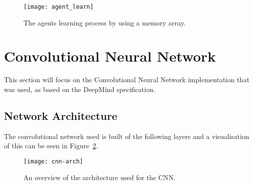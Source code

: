 \begin{figure}[h]
    \centering
    \texttt{[image: agent\_learn]}
    \caption{The agents learning process by using a memory array.}%
    \label{fig:agent_learn}
\end{figure}

\section{Convolutional Neural Network}

This section will focus on the Convolutional Neural Network implementation that
was used, as based on the DeepMind specification.

\subsection{Network Architecture}

The convolutional network used is built of the following layers and a
visualisation of this can be seen in Figure~\ref{fig:cnn_arch}.

\begin{figure}[h]
    \centering
    \texttt{[image: cnn-arch]}
    \caption{An overview of the architecture used for the CNN.}%
    \label{fig:cnn_arch}
\end{figure}

